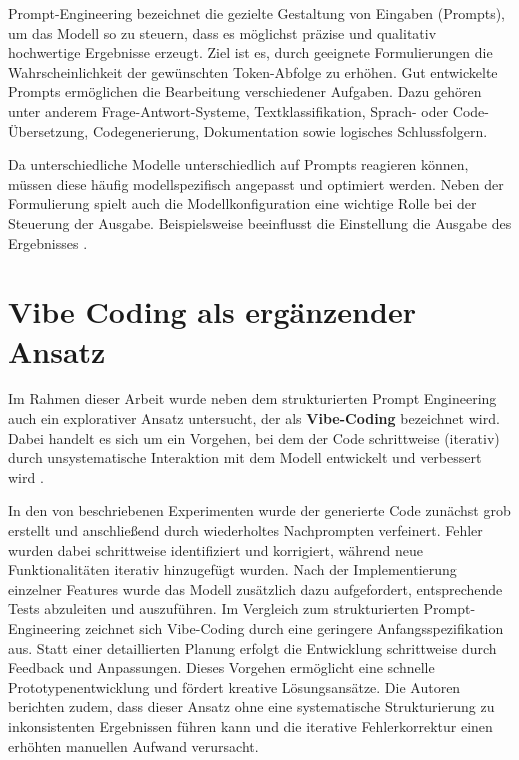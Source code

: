 Prompt-Engineering bezeichnet die gezielte Gestaltung
von Eingaben (Prompts), um das Modell so zu steuern,
dass es möglichst präzise und qualitativ hochwertige
Ergebnisse erzeugt. Ziel ist es, durch geeignete Formulierungen die Wahrscheinlichkeit der gewünschten Token-Abfolge zu erhöhen. Gut entwickelte Prompts ermöglichen die Bearbeitung verschiedener Aufgaben. Dazu gehören unter anderem Frage-Antwort-Systeme, Textklassifikation, Sprach- oder Code-Übersetzung, Codegenerierung, Dokumentation sowie logisches Schlussfolgern.

Da unterschiedliche Modelle unterschiedlich auf
Prompts reagieren können, müssen diese häufig
modellspezifisch angepasst und optimiert werden.
Neben der Formulierung spielt auch die Modellkonfiguration
eine wichtige Rolle bei der Steuerung der Ausgabe.
Beispielsweise beeinflusst die Einstellung 
die Ausgabe des Ergebnisses \cite{boonstra2024prompt}.

\section{Vibe Coding als ergänzender Ansatz}

Im Rahmen dieser Arbeit wurde neben dem strukturierten
Prompt Engineering auch ein explorativer Ansatz
untersucht, der als \textbf{Vibe-Coding} bezeichnet wird. Dabei handelt es sich um ein Vorgehen, bei
dem der Code schrittweise (iterativ) durch unsystematische Interaktion mit dem Modell
entwickelt und verbessert wird \cite{ray2024vibecoding}.

In den von \cite{ray2024vibecoding} beschriebenen Experimenten wurde der generierte
Code zunächst grob erstellt und anschließend durch
wiederholtes Nachprompten verfeinert. Fehler wurden dabei schrittweise identifiziert und
korrigiert, während neue Funktionalitäten iterativ hinzugefügt wurden. Nach der Implementierung einzelner Features wurde das Modell zusätzlich dazu aufgefordert, entsprechende Tests abzuleiten und auszuführen.
Im Vergleich zum strukturierten Prompt-Engineering zeichnet sich Vibe-Coding durch eine geringere Anfangsspezifikation aus. Statt einer detaillierten Planung erfolgt die Entwicklung schrittweise durch Feedback und Anpassungen.
Dieses Vorgehen ermöglicht eine schnelle Prototypenentwicklung und fördert kreative Lösungsansätze.
Die Autoren berichten zudem, dass dieser Ansatz ohne eine systematische Strukturierung zu inkonsistenten Ergebnissen führen kann und die iterative Fehlerkorrektur einen erhöhten manuellen Aufwand verursacht\cite{ray2024vibecoding}.


